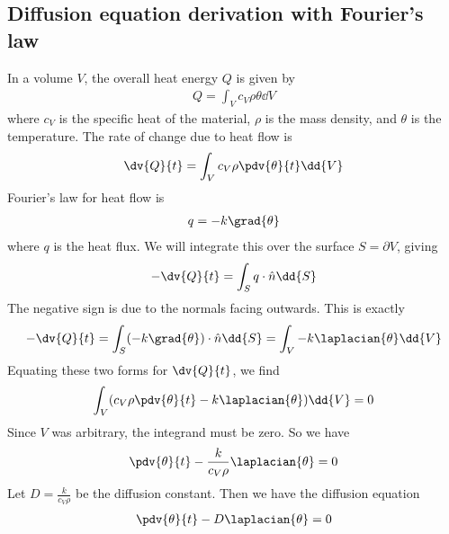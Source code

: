 \subsection{Diffusion equation derivation with Fourier's law}
In a volume $V$, the overall heat energy $Q$ is given by
\begin{align*}
	Q = \int_V c_V \rho \theta \dd{V}
\end{align*}
where $c_V$ is the specific heat of the material, $\rho$ is the mass density, and $\theta$ is the temperature.
The rate of change due to heat flow is
\begin{align*}
	\dv{Q}{t} = \int_V c_V \rho \pdv{\theta}{t} \dd{V}
\end{align*}
Fourier's law for heat flow is
\begin{align*}
	q = -k \grad{\theta}
\end{align*}
where $q$ is the heat flux.
We will integrate this over the surface $S = \partial V$, giving
\begin{align*}
	-\dv{Q}{t} = \int_S q \cdot \hat n \dd{S}
\end{align*}
The negative sign is due to the normals facing outwards.
This is exactly
\begin{align*}
	-\dv{Q}{t} = \int_S (-k \grad{\theta}) \cdot \hat n \dd{S} = \int_V -k \laplacian{\theta} \dd{V}
\end{align*}
Equating these two forms for $\dv{Q}{t}$, we find
\begin{align*}
	\int_V (c_V \rho \pdv{\theta}{t} - k \laplacian{\theta}) \dd{V} = 0
\end{align*}
Since $V$ was arbitrary, the integrand must be zero.
So we have
\begin{align*}
	\pdv{\theta}{t} - \frac{k}{c_V \rho} \laplacian{\theta} = 0
\end{align*}
Let $D = \frac{k}{c_V \rho}$ be the diffusion constant.
Then we have the diffusion equation
\begin{align*}
	\pdv{\theta}{t} - D \laplacian{\theta} = 0
\end{align*}


